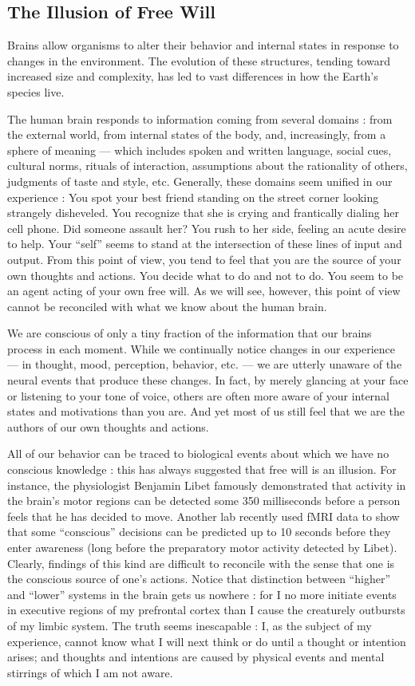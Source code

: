 \documentclass[a4paper,14pt]{extbook}
\begin{document}
\subsection{The Illusion of Free Will}

Brains allow organisms to alter their behavior and internal states in response to changes in the environment.
The evolution of these structures, tending toward increased size and complexity, has led to vast differences in how the Earth’s species live.

The human brain responds to information coming from several domains :
from the external world, from internal states of the body, and, increasingly, from a sphere of meaning --- which includes spoken and written language, social cues, cultural norms, rituals of interaction, assumptions about the rationality of others, judgments of taste and style, etc.
Generally, these domains seem unified in our experience :
You spot your best friend standing on the street corner looking strangely disheveled.
You recognize that she is crying and frantically dialing her cell phone.
Did someone assault her?
You rush to her side, feeling an acute desire to help.
Your ``self'' seems to stand at the intersection of these lines of input and output.
From this point of view, you tend to feel that you are the source of your own thoughts and actions.
You decide what to do and not to do.
You seem to be an agent acting of your own free will.
As we will see, however, this point of view cannot be reconciled with what we know about the human brain.

We are conscious of only a tiny fraction of the information that our brains process in each moment.
While we continually notice changes in our experience --- in thought, mood, perception, behavior, etc. --- we are utterly unaware of the neural events that produce these changes.
In fact, by merely glancing at your face or listening to your tone of voice, others are often more aware of your internal states and motivations than you are.
And yet most of us still feel that we are the authors of our own thoughts and actions.

All of our behavior can be traced to biological events about which we have no conscious knowledge :
this has always suggested that free will is an illusion.
For instance, the physiologist Benjamin Libet famously demonstrated that activity in the brain’s motor regions can be detected some 350 milliseconds before a person feels that he has decided to move.
Another lab recently used fMRI data to show that some ``conscious'' decisions can be predicted up to 10 seconds before they enter awareness (long before the preparatory motor activity detected by Libet).
Clearly, findings of this kind are difficult to reconcile with the sense that one is the conscious source of one’s actions.
Notice that distinction between ``higher'' and ``lower'' systems in the brain gets us nowhere :
for I no more initiate events in executive regions of my prefrontal cortex than I cause the creaturely outbursts of my limbic system.
The truth seems inescapable :
I, as the subject of my experience, cannot know what I will next think or do until a thought or intention arises;
and thoughts and intentions are caused by physical events and mental stirrings of which I am not aware.
\end{document}
